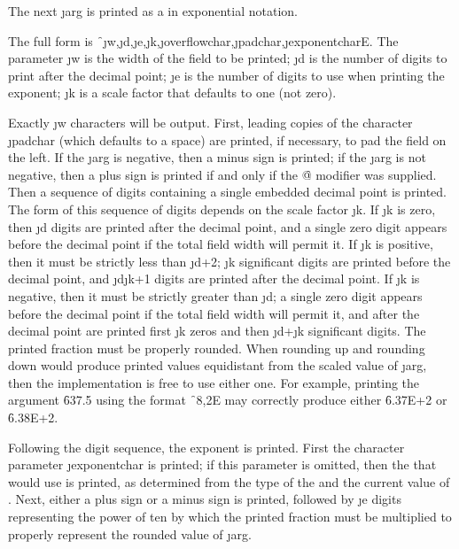
The next \j{arg} is printed as a  in exponential notation.

The full form is
\f{~\j{w},\j{d},\j{e},\j{k},\j{overflowchar},\j{padchar},\j{exponentchar}E}.
The parameter \j{w}
is the width of the field to be printed; \j{d} is the number
of digits to print after the decimal point; \j{e} is the number
of digits to use when printing the exponent;
\j{k} is a scale factor that defaults to one (not zero).

Exactly \j{w} characters will
be output.  First, leading copies of the character \j{padchar}
(which defaults to a space) are printed, if necessary, to pad the
field on the left.
If the \j{arg} is negative, then a minus sign is printed;
if the \j{arg} is not negative, then a plus sign is printed
if and only if the \f{@}
modifier was supplied.  Then a sequence
of digits containing a single embedded decimal point is printed.
The form of this sequence of digits depends on the scale factor \j{k}.
If \j{k} is zero, then \j{d} digits are printed after the decimal
point, and a single zero digit appears before the decimal point if
the total field width will permit it.  If \j{k} is positive,
then it must be strictly less than \j{d}+2;  \j{k} significant digits
are printed before the decimal point, and \j{d}\minussign \j{k}+1
digits are printed after the decimal point.  If \j{k} is negative,
then it must be strictly greater than \minussign \j{d};
a single zero digit appears before the decimal point if
the total field width will permit it, and after the decimal point
are printed first
\minussign \j{k} zeros and then \j{d}+\j{k} significant digits.
The printed fraction must be properly rounded.         
When rounding up and rounding down would produce printed values
equidistant from the scaled value of \j{arg}, then the implementation
is free to use either one.  For example, printing the argument
\f{637.5} using the format \f{~8,2E} may correctly produce
either \f{6.37E+2} or \f{6.38E+2}.

Following the digit sequence, the exponent is printed.
First the character parameter \j{exponentchar} is printed; if this
parameter is omitted, then the  that
 would use is printed, as determined from the
type of the  and the current value of
.
Next, either a plus sign or a minus sign
is printed, followed by \j{e} digits representing the power of
ten by which the printed fraction must be multiplied
to properly represent the rounded value of \j{arg}.

